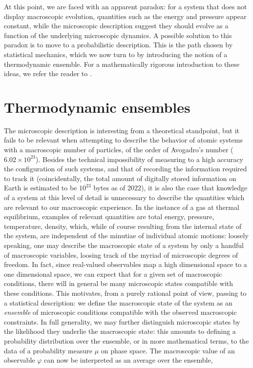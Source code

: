 At this point, we are faced with an apparent paradox: for a system that does not display macroscopic evolution, quantities such as the energy and pressure appear constant, while the microscopic description suggest they should evolve as a function of the underlying microscopic dynamics.
A possible solution to this paradox is to move to a probabilistic description. This is the path chosen by statistical mechanics, which we now turn to by introducing the notion of a thermodynamic ensemble. For a mathematically rigorous introduction to these ideas, we refer the reader to \cite[Chapter 3]{E07}.

\section{Thermodynamic ensembles}
The microscopic description is interesting from a theoretical standpoint, but it fails to be relevant when attempting to describe the behavior of atomic systems with a macroscopic number of particles, of the order of Avogadro's number ($6.02 \times 10^{23} $).
Besides the technical impossibility of measuring to a high accuracy the configuration of such systems, and that of recording the information required to track it (coincidentally, the total amount of digitally stored information on Earth is estimated to be $10^{23}$ bytes as of 2022), it is also the case that knowledge of a system at this level of detail is unnecessary to describe the quantities which are relevant to our macroscopic experience.
In the instance of a gas at thermal equilibrium, examples of relevant quantities are total energy, pressure, temperature, density, which, while of course resulting from the internal state of the system, are independent of the minutiae of individual atomic motions: loosely speaking, one may describe the macroscopic state of a system by only a handful of macroscopic variables, loosing track of the myriad of microscopic degrees of freedom.
In fact, since real-valued observables map a high dimensional space to a one dimensional space, we can expect that for a given set of macroscopic conditions, there will in general be many microscopic states compatible with these conditions.
This motivates, from a purely rational point of view, passing to a statistical description: we define the macroscopic state of the system as an \textit{ensemble} of microscopic conditions compatible with the observed macroscopic constraints.
In full generality, we may further distinguish microscopic states by the likelihood they underlie the macroscopic state: this amounts to defining a probability distribution over the ensemble, or in more mathematical terms, to the data of a probability measure $\mu$ on phase space.
The macroscopic value of an observable $\varphi$ can now be interpreted as an average over the ensemble,

